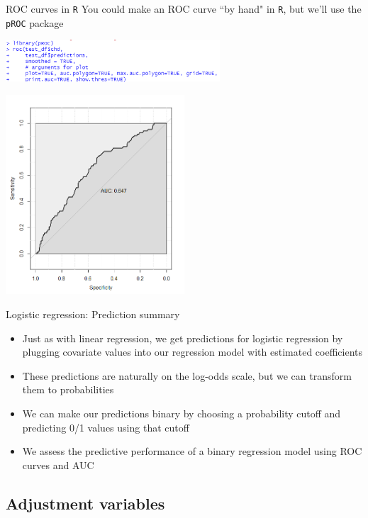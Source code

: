 \documentclass[10pt,t]{beamer}
\begin{document}
\begin{frame}{ROC curves in \texttt{R}}
	\vspace{-0.5cm}
	You could make an ROC curve ``by hand" in \texttt{R}, but we'll use the \texttt{pROC} package
	\begin{center}
		\includegraphics[width=0.6\textwidth]{./figs/roc_example_code}
	\end{center}
	\begin{center}
	\includegraphics[width=0.5\textwidth]{./figs/wcgs_roc}
\end{center}
\end{frame}

\begin{frame}{Logistic regression: Prediction summary}
	\begin{itemize}
		\item Just as with linear regression, we get predictions for logistic regression by plugging covariate values into our regression model with estimated coefficients \pause
		\item These predictions are naturally on the log-odds scale, but we can transform them to probabilities\pause
		\item We can make our predictions binary by choosing a probability cutoff and predicting 0/1 values using that cutoff \pause
		\item We assess the predictive performance of a binary regression model using ROC curves and AUC
	\end{itemize}
\end{frame}

\subsection{Adjustment variables}
\end{document}
